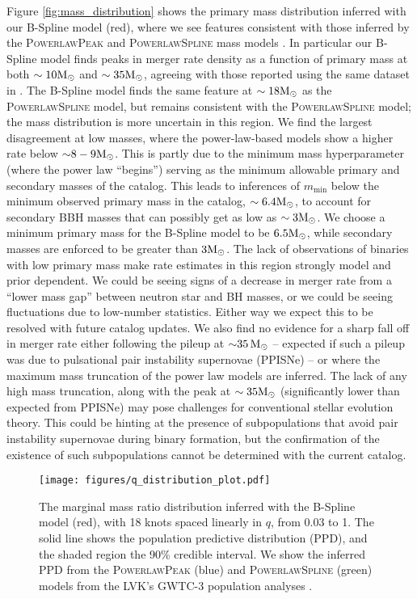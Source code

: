 Figure \ref{fig:mass_distribution} shows the primary mass distribution inferred with our B-Spline model (red), where we see features consistent with those inferred by the \textsc{PowerlawPeak} and \textsc{PowerlawSpline} mass models \citep{Talbot_2018,o3a_pop,Edelman_2022ApJ,o3b_astro_dist}. 
In particular our B-Spline model finds peaks in merger rate density as a function of primary mass at both $\sim10{\rm M}_\odot$ and $\sim35{\rm M}_\odot$, agreeing with those 
reported using the same dataset in \citet{o3b_astro_dist}. The B-Spline model finds the same feature at $\sim18{\rm M}_\odot$ as the \textsc{PowerlawSpline} model, but remains consistent with the \textsc{PowerlawSpline} model; the mass distribution is more uncertain in this region.
We find the largest disagreement at low masses, where the power-law-based models show a higher rate below ${\sim}8-9{\rm M}_\odot$. This is partly due to the minimum mass hyperparameter (where the power law ``begins'') serving as the minimum allowable primary and secondary masses of the catalog. This leads to inferences of $m_\mathrm{min}$ below the minimum observed primary mass in the catalog, $\sim 6.4{\rm M}_\odot$, to account for secondary BBH masses 
that can possibly get as low as $\sim 3{\rm M}_\odot$. We choose a minimum primary mass for 
the B-Spline model to be $6.5{\rm M}_\odot$, while secondary masses are enforced to be greater than $3{\rm M}_\odot$. The lack of observations of binaries with low primary mass make rate estimates in this region strongly model and prior dependent.  We could be seeing signs of a decrease in merger rate from a ``lower mass gap'' between neutron star and BH masses, or we could be seeing fluctuations due to low-number statistics.  Either way we expect this to be resolved with future catalog updates. We also find no evidence for a sharp fall off in merger rate either following 
the pileup at ${\sim}35\,{\rm M}_\odot$ -- expected if such a pileup was due to pulsational pair instability supernovae (PPISNe) -- or where the maximum mass truncation of the power law models 
are inferred. The lack of any high mass truncation, along with the peak at $\sim35{\rm M}_\odot$ (significantly lower than expected from PPISNe) may pose challenges for conventional stellar 
evolution theory. This could be hinting at the presence of subpopulations that avoid pair instability supernovae during binary formation, but the confirmation of the existence of such subpopulations 
cannot be determined with the current catalog. 

\begin{figure}[h]
    \texttt{[image: figures/q\_distribution\_plot.pdf]}
    \caption{The marginal mass ratio distribution inferred with the B-Spline model (red), with 18 knots spaced linearly in $q$, from 0.03 to 1. The solid line shows the population predictive distribution (PPD), and the shaded region the 90\% credible interval. 
    We show the inferred PPD from the \textsc{PowerlawPeak} (blue) and \textsc{PowerlawSpline} (green) models from the LVK's GWTC-3 population analyses \citep{o3b_astro_dist}.}
    \label{fig:q_distribution}
\end{figure}

